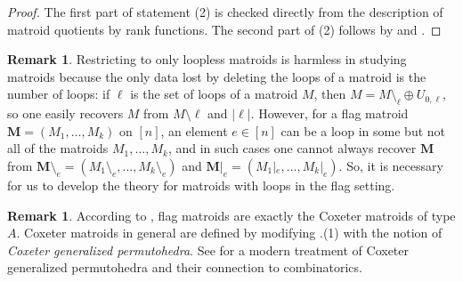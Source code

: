 \documentclass[11pt]{amsart}
\newcommand{\MM}{{\boldsymbol M}}
\theoremstyle{definition}
\newtheorem{rem}[thm]{Remark}
\newcommand{\madeline}[1]{{\color{magenta} \sf  Madeline: [#1]}}
\newcommand{\leon}[1]{{\color{teal} \sf Leon: [#1]}}
\newcommand{\chris}[1]{{\color{cyan} \sf Chris: [#1]}}
\begin{document}
\begin{proof}
The first part of statement (2) is checked directly from the description of matroid quotients by rank functions.  The second part of (2) follows by  and .
\end{proof}

\begin{rem}\label{rem:looplessbad}
Restricting to only loopless matroids is harmless in studying matroids because the only data lost by deleting the loops of a matroid is the number of loops:  if $\ell$ is the set of loops of a matroid $M$, then $M = M\setminus_{\ell} \oplus U_{0,\ell}$, so one easily recovers $M$ from $M\setminus\ell$ and $|\ell|$.
However, for a flag matroid $\MM = (M_1, \ldots, M_k)$ on $[n]$, an element $e\in [n]$ can be a loop in some but not all of the matroids $M_1, \ldots, M_k$, and in such cases one cannot always recover $\MM$ from $\MM\setminus_e = (M_1 \setminus_e, \ldots, M_k \setminus_e)$ and $\MM|_e = (M_1|_e, \ldots, M_k|_e)$. So, it is necessary for us to develop the theory for matroids with loops in the flag setting.
\end{rem}

\begin{rem}
According to \cite{GS87a, BGW03}, flag matroids are exactly the Coxeter matroids of type $A$.  Coxeter matroids in general are defined by modifying  .(1) with the notion of \emph{Coxeter generalized permutohedra}.  See \cite{ACEP20} for a modern treatment of Coxeter generalized permutohedra and their connection to combinatorics.
\end{rem}




\end{document}
